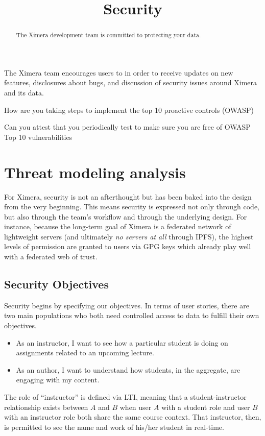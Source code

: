 \documentclass{ximera}
\title{Security}
\begin{document}
\begin{abstract}
  The Ximera development team is committed to protecting your data.
\end{abstract}
\maketitle

The Ximera team encourages users to  in order to receive
updates on new features, disclosures about bugs, and discussion of
security issues around Ximera and its data.

How are you taking steps to implement the top 10 proactive controls
(OWASP)

Can you attest that you periodically test to make sure you are free of
OWASP Top 10 vulnerabilities

\section{Threat modeling analysis}

For Ximera, security is not an afterthought but has been baked into
the design from the very beginning.  This means security is expressed
not only through code, but also through the team's workflow and
through the underlying design.  For instance, because the long-term
goal of Ximera is a federated network of lightweight servers (and
ultimately \textit{no servers at all} through IPFS), the highest
levels of permission are granted to users via GPG keys which already
play well with a federated web of trust.

\subsection{Security Objectives}

Security begins by specifying our objectives.  In terms of user
stories, there are two main populations who both need controlled
access to data to fulfill their own objectives.
\begin{itemize}
\item As an instructor, I want to see how a particular student is
  doing on assignments related to an upcoming lecture.
\item As an author, I want to understand how students, in the
  aggregate, are engaging with my content.
\end{itemize}
The role of ``instructor'' is defined via LTI, meaning that a
student-instructor relationship exists between $A$ and $B$ when user
$A$ with a student role and user $B$ with an instructor role both
share the same course context.  That instructor, then, is permitted to
see the name and work of his/her student in real-time.
\end{document}
